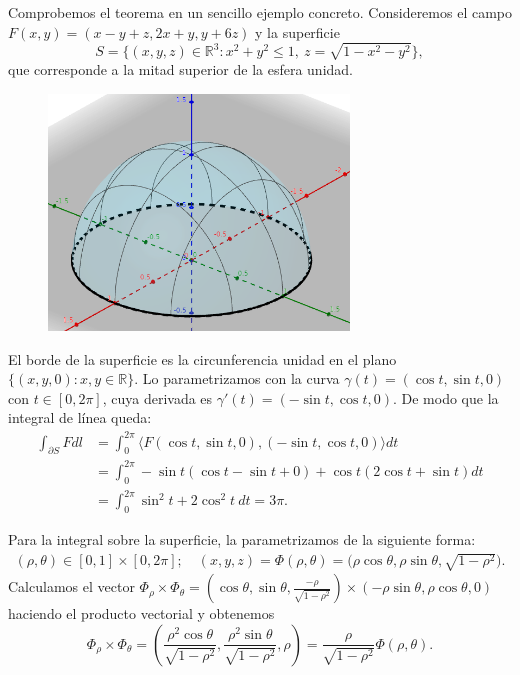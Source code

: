 \documentclass[12pt,spanish]{article}
\theoremstyle{definition}
\theoremstyle{remark}
\begin{document}
Comprobemos el teorema en un sencillo ejemplo concreto. Consideremos el campo $F(x,y)=(x-y+z,2x+y,y+6z)$ y la superficie \[S=\big\{(x,y,z)\in\mathbb{R}^3: x^2+y^2\leq 1, \  z=\sqrt{1-x^2-y^2}\big\},\]
que corresponde a la mitad superior de la esfera unidad.

\begin{figure}[H]
	\centering
	\includegraphics[width=80mm]{images/superficie-ejemplo-stokes}
\end{figure}

El borde de la superficie es la circunferencia unidad en el plano $\{(x,y,0):x,y\in\mathbb{R}\}$. Lo parametrizamos con la curva $\gamma(t)=(\cos t,\sin t, 0)$ con $t\in[0,2\pi]$, cuya derivada es $\gamma'(t)=(-\sin t, \cos t, 0)$. De modo que la integral de línea queda:
\begin{align*}
\int_{\partial S} F dl&=\int_0^{2\pi}\langle F(\cos t,\sin t, 0),(-\sin t, \cos t, 0) \rangle dt \\ 
&=\int_0^{2\pi} -\sin t (\cos t-\sin t+0)+\cos t (2\cos t+\sin t)dt \\
&=\int_0^{2\pi} \sin^2 t + 2\cos^2t \ dt = 3\pi.
\end{align*}

Para la integral sobre la superficie, la parametrizamos de la siguiente forma:
\begin{gather*}
(\rho,\theta)\in[0,1]\times[0,2\pi];\quad (x,y,z)=\Phi(\rho,\theta)=\big(\rho\cos \theta, \rho\sin\theta, \sqrt{1-\rho^2}\big).
\end{gather*}
Calculamos el vector $\Phi_\rho\times \Phi_\theta=\left(\cos\theta,\sin\theta,\frac{-\rho}{\sqrt{1-\rho^2}}\right)\times (-\rho\sin\theta,\rho\cos\theta,0)$ haciendo el producto vectorial y obtenemos
\[\Phi_\rho\times \Phi_\theta=\left(\frac{\rho^2\cos\theta}{\sqrt{1-\rho^2}},\frac{\rho^2\sin\theta}{\sqrt{1-\rho^2}},\rho\right)=\frac{\rho}{\sqrt{1-\rho^2}}\Phi(\rho,\theta).\]
\end{document}
